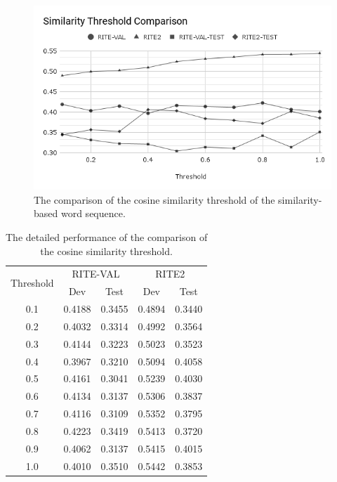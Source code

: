 \documentclass[12pt]{article}
\begin{document}
\begin{CJK*}{UTF8}{bkai}
\begin{spacing}{1.77}
\begin{figure}[H]
  \centering
  \includegraphics[width=15cm]{SimThresholdComp.png}
  \caption[Cosine Similarity Threshold Comparison]{The comparison of the cosine similarity threshold of the similarity-based word sequence.}
  \label{fig:threshold}
\end{figure}

\begin{table}[H]
  \centering
  \setlength{\extrarowheight}{-3pt}
  \caption{The detailed performance of the comparison of the cosine similarity threshold.}
  \label{result:threshold_comparison}
  \begin{tabular}{|c|r|r|r|r|}
  \hline
  \multirow{2}{*}{Threshold} & \multicolumn{2}{c|}{RITE-VAL} & \multicolumn{2}{c|}{RITE2} \\ \cline{2-5}
   & \multicolumn{1}{c|}{Dev} & \multicolumn{1}{c|}{Test} & \multicolumn{1}{c|}{Dev} & \multicolumn{1}{c|}{Test} \\ \hline
  0.1 & 0.4188 & 0.3455 & 0.4894 & 0.3440 \\ \hline
  0.2 & 0.4032 & 0.3314 & 0.4992 & 0.3564 \\ \hline
  0.3 & 0.4144 & 0.3223 & 0.5023 & 0.3523 \\ \hline
  0.4 & 0.3967 & 0.3210 & 0.5094 & 0.4058 \\ \hline
  0.5 & 0.4161 & 0.3041 & 0.5239 & 0.4030 \\ \hline
  0.6 & 0.4134 & 0.3137 & 0.5306 & 0.3837 \\ \hline
  0.7 & 0.4116 & 0.3109 & 0.5352 & 0.3795 \\ \hline
  0.8 & 0.4223 & 0.3419 & 0.5413 & 0.3720 \\ \hline
  0.9 & 0.4062 & 0.3137 & 0.5415 & 0.4015 \\ \hline
  1.0 & 0.4010 & 0.3510 & 0.5442 & 0.3853 \\ \hline
  \end{tabular}
\end{table}


\end{spacing}
\end{CJK*}
\end{document}
